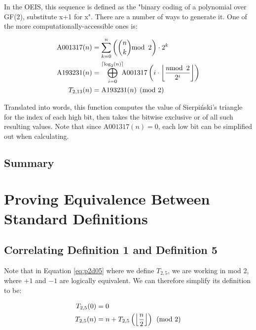 \documentclass[conference]{IEEEtran}
\begin{document}

In the OEIS, this sequence \cite{OEIS-A193231} is defined as the "binary coding of a polynomial over GF(2), substitute x+1 for x". There are a number of ways to generate it. One of the more computationally-accessible ones is:

\begin{equation}
    \label{eq:p2d13}
    \begin{aligned}
\text{A001317}(n) &= \sum_{k=0}^n \left(\binom{n}{k} \mod{2} \right) \cdot 2^k \\
\text{A193231}(n) &= \bigoplus_{i=0}^{\ceil{\log_2(n)}} \hspace{-5pt} \text{A001317}\left(i \cdot \floor{\dfrac{n \mod{2}}{2^i}}\right) \\
      T_{2,13}(n) &= \text{A193231}(n) \pmod{2}
    \end{aligned}
\end{equation}

Translated into words, this function computes the value of Sierpiński's triangle for the index of each high bit, then takes the bitwise exclusive or of all such resulting values. Note that since $\text{A001317}(n) = 0$, each low bit can be simplified out when calculating.


\subsection{Summary}

\section{Proving Equivalence Between Standard Definitions}

\subsection{Correlating Definition 1 and Definition 5}

Note that in Equation \ref{eq:p2d05} where we define $T_{2,5}$, we are working in mod 2, where $+1$ and $-1$ are logically equivalent. We can therefore simplify its definition to be:

\begin{equation}
    \label{eq:p2d05s}
    \begin{aligned}
T_{2,5}(0) &= 0 \\
T_{2,5}(n) &= n + T_{2,5}\left(\floor{\dfrac{n}{2}}\right) \pmod{2}
    \end{aligned}
\end{equation}
\end{document}
